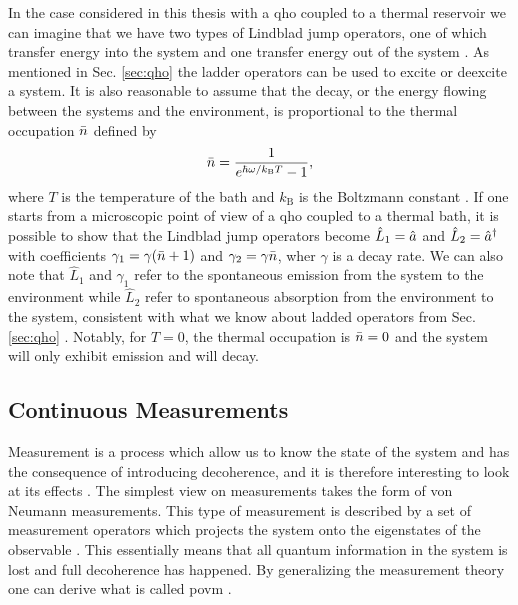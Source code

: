 In the case considered in this thesis with a \gls{qho} coupled to a thermal reservoir we can imagine that we have two types of Lindblad jump operators, one of which transfer energy into the system and one transfer energy out of the system \cite{Meystre:2021}. As mentioned in Sec. \ref{sec:qho} the ladder operators can be used to excite or deexcite a system. It is also reasonable to assume that the decay, or the energy flowing between the systems and the environment, is proportional to the thermal occupation $\bar{n}$ defined by
\begin{equation}
    \bar{n} = \frac{1}{e^{\hbar\omega/ k_\mathrm{B}T} - 1},
\end{equation}
where $T$ is the temperature of the bath and $k_\mathrm{B}$ is the Boltzmann constant \cite{Meystre:2021}. If one starts from a microscopic point of view of a \gls{qho} coupled to a thermal bath, it is possible to show that the Lindblad jump operators become $\hat{L}_1 = \hat{a}$ and $\hat{L}_2 = \hat{a}^{\dagger}$ with coefficients $\gamma_1 = \gamma(\bar{n} + 1)$ and $\gamma_2 = \gamma \bar{n}$, wher $\gamma$ is a decay rate. We can also note that $\hat{L}_1$ and $\gamma_1$ refer to the spontaneous emission from the system to the environment while $\hat{L}_2$ refer to spontaneous absorption from the environment to the system, consistent with what we know about ladded operators from Sec. \ref{sec:qho} \cite{Meystre:2021}. Notably, for $T=0$, the thermal occupation is $\bar{n} = 0$ and the system will only exhibit emission and will decay.


\subsection{Continuous Measurements}
Measurement is a process which allow us to know the state of the system and has the consequence of introducing decoherence, and it is therefore interesting to look at its effects \cite{Jordan:2024}. The simplest view on measurements takes the form of von Neumann measurements. This type of measurement is described by a set of measurement operators which projects the system onto the eigenstates of the observable \cite{Annby-Andersson:2024}. This essentially means that all quantum information in the system is lost and full decoherence has happened. By generalizing the measurement theory one can derive what is called \gls{povm} \cite{Annby-Andersson:2024}.

